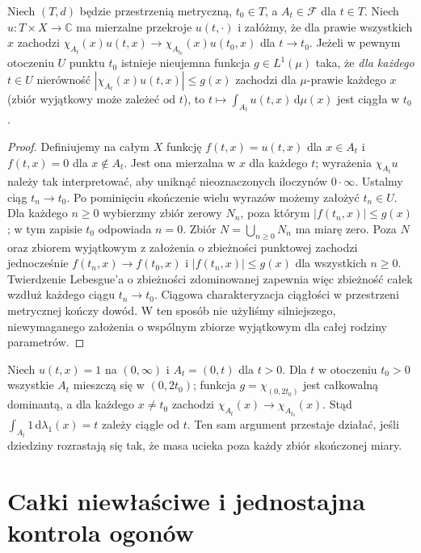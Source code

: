 \begin{twierdzenie}
\label{thm:moving-domains-11}
Niech $(T,d)$ będzie przestrzenią metryczną, $t_0\in T$,
a $A_t\in\mathcal F$ dla $t\in T$. Niech $u:T\times X\to\mathbb C$
ma mierzalne przekroje $u(t,\cdot)$ i załóżmy, że dla prawie
wszystkich $x$ zachodzi
$\chi_{A_t}(x)u(t,x)\to\chi_{A_{t_0}}(x)u(t_0,x)$
dla $t\to t_0$. Jeżeli w pewnym otoczeniu $U$ punktu $t_0$
istnieje nieujemna funkcja $g\in L^1(\mu)$ taka, że
\emph{dla każdego} $t\in U$ nierówność
$|\chi_{A_t}(x)u(t,x)|\le g(x)$
zachodzi dla $\mu$-prawie każdego $x$ (zbiór wyjątkowy
może zależeć od $t$), to
$t\mapsto\int_{A_t}u(t,x)\,\mathrm d\mu(x)$
jest ciągła w $t_0$.
\end{twierdzenie}
\begin{proof}
Definiujemy na całym $X$ funkcję
$f(t,x)=u(t,x)$ dla $x\in A_t$ i $f(t,x)=0$
dla $x\notin A_t$. Jest ona mierzalna w $x$ dla każdego $t$;
wyrażenia $\chi_{A_t}u$ należy tak interpretować,
aby uniknąć nieoznaczonych iloczynów $0\cdot\infty$.
Ustalmy ciąg $t_n\to t_0$. Po pominięciu skończenie
wielu wyrazów możemy założyć $t_n\in U$. Dla każdego
$n\ge0$ wybierzmy zbiór zerowy $N_n$, poza którym
$|f(t_n,x)|\le g(x)$; w tym zapisie $t_0$ odpowiada
$n=0$. Zbiór $N=\bigcup_{n\ge0}N_n$ ma miarę zero.
Poza $N$ oraz zbiorem wyjątkowym z założenia o zbieżności
punktowej zachodzi jednocześnie $f(t_n,x)\to f(t_0,x)$
i $|f(t_n,x)|\le g(x)$ dla wszystkich $n\ge0$.
Twierdzenie Lebesgue'a o zbieżności zdominowanej
zapewnia więc zbieżność całek wzdłuż każdego ciągu
$t_n\to t_0$. Ciągowa charakteryzacja ciągłości
w przestrzeni metrycznej kończy dowód. W ten sposób
nie użyliśmy silniejszego, niewymaganego założenia
o wspólnym zbiorze wyjątkowym dla całej rodziny parametrów.
\end{proof}

\begin{przyklad}
Niech $u(t,x)=1$ na $(0,\infty)$ i $A_t=(0,t)$ dla $t>0$.
Dla $t$ w otoczeniu $t_0>0$ wszystkie $A_t$ mieszczą się
w $(0,2t_0)$; funkcja $g=\chi_{(0,2t_0)}$ jest
całkowalną dominantą, a dla każdego $x\ne t_0$
zachodzi $\chi_{A_t}(x)\to\chi_{A_{t_0}}(x)$.
Stąd $\int_{A_t}1\,\mathrm d\lambda_1(x)=t$ zależy ciągle od $t$.
Ten sam argument przestaje działać, jeśli dziedziny rozrastają
się tak, że masa ucieka poza każdy zbiór skończonej miary.
\end{przyklad}

\section{Całki niewłaściwe i jednostajna kontrola ogonów}

